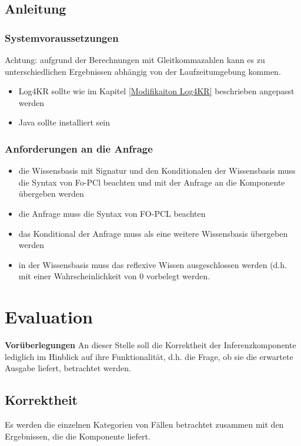 \documentclass[a4paper, 11pt]{book}
\begin{document}
{\begin{itemize}
\end{itemize}


\section{Anleitung}
\subsection{Systemvoraussetzungen}
Achtung: aufgrund der Berechnungen mit Gleitkommazahlen kann es zu unterschiedlichen Ergebnissen abhängig von der Laufzeitumgebung kommen. 
\begin{itemize}
	\item Log4KR sollte wie im Kapitel \ref{Modifikaiton Log4KR} beschrieben angepasst werden
	\item Java sollte installiert sein
\end{itemize}
\subsection{Anforderungen an die Anfrage}
\begin{itemize}
	\item die Wissensbasis mit Signatur und den Konditionalen der Wissensbasis muss die Syntax von Fo-PCl beachten und mit der Anfrage an die Komponente übergeben werden
	\item die Anfrage muss die Syntax von FO-PCL beachten
	\item das Konditional der Anfrage muss als eine weitere Wissensbasis übergeben werden
	\item in der Wissensbasis muss das reflexive Wissen ausgeschlossen werden (d.h. mit einer Wahrscheinlichkeit von 0 vorbelegt werden. 
\end{itemize}


\chapter{Evaluation}\label{eval} 
\textbf{Vorüberlegungen}
An dieser Stelle soll die Korrektheit der Inferenzkomponente lediglich im Hinblick auf ihre Funktionalität, d.h. die Frage, ob sie die erwartete Ausgabe liefert, betrachtet werden. 

\section{Korrektheit} \label{Korrektheit}
Es werden die einzelnen Kategorien von Fällen betrachtet zusammen mit den Ergebnissen, die die Komponente liefert. 

}
\end{document}
